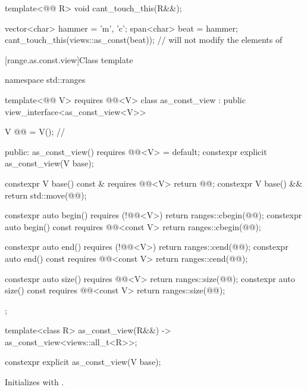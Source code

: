 \pnum
\begin{example}
\begin{codeblock}
template<@@ R>
void cant_touch_this(R&&);

vector<char> hammer = {'m', 'c'};
span<char> beat = hammer;
cant_touch_this(views::as_const(beat));         // will not modify the elements of 
\end{codeblock}
\end{example}

[range.as.const.view]{Class template }

\begin{codeblock}
namespace std::ranges {
  template<@@ V>
    requires @@<V>
  class as_const_view : public view_interface<as_const_view<V>> {
    V @@ = V();      // \expos

  public:
    as_const_view() requires @@<V> = default;
    constexpr explicit as_const_view(V base);

    constexpr V base() const & requires @@<V> { return @@; }
    constexpr V base() && { return std::move(@@); }

    constexpr auto begin() requires (!@@<V>) { return ranges::cbegin(@@); }
    constexpr auto begin() const requires @@<const V> { return ranges::cbegin(@@); }

    constexpr auto end() requires (!@@<V>) { return ranges::cend(@@); }
    constexpr auto end() const requires @@<const V> { return ranges::cend(@@); }

    constexpr auto size() requires @@<V> { return ranges::size(@@); }
    constexpr auto size() const requires @@<const V> { return ranges::size(@@); }
  };

  template<class R>
    as_const_view(R&&) -> as_const_view<views::all_t<R>>;
}
\end{codeblock}

\begin{itemdecl}
constexpr explicit as_const_view(V base);
\end{itemdecl}

\begin{itemdescr}
\pnum
\effects
Initializes  with .
\end{itemdescr}

